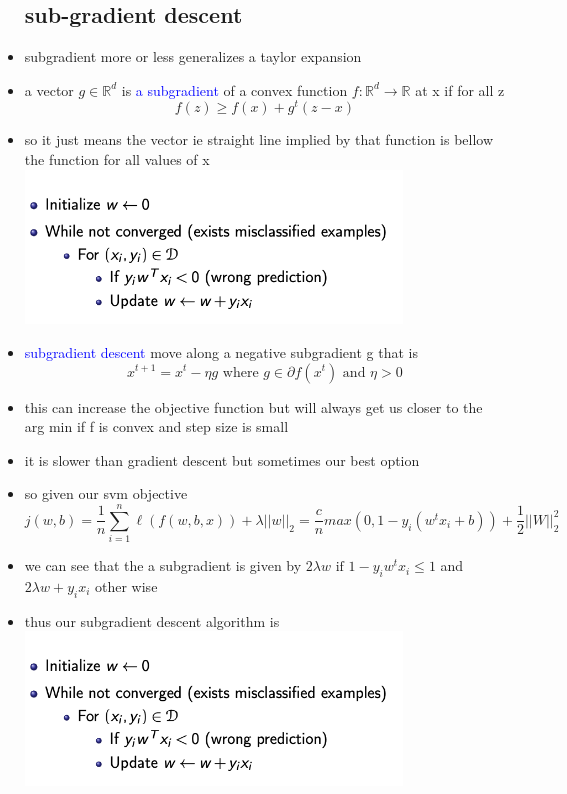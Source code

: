 \documentclass{article}
\begin{document}
\begin{itemize}
\subsection*{sub-gradient descent}
\item subgradient more or less generalizes a taylor expansion 
\item a vector $g\in \mathbb{R}^{d}$ is \textcolor{blue}{a subgradient} of a convex function $f:\mathbb{R}^{d}\rightarrow \mathbb{R}$ at x if for all z $$f(z)\geq f(x)+g^t(z-x)$$
\item so it just means the vector ie straight line implied by that function is bellow the function for all values of x\\ \includegraphics*[width=10cm]{images/Screenshot 2023-05-12 at 12.21.31 PM.png}
\item \textcolor{blue}{subgradient descent} move along a negative subgradient g that is $$x^{t+1}=x^t-\eta g \text{ where } g\in \partial f(x^t)\text{ and }\eta>0$$
\item this can increase the objective function but will always get us closer to the arg min if f is convex and step size is small 
\item it is slower than gradient descent but sometimes our best option 
\item so given our svm objective  $$j(w,b)=\frac{1}{n}\sum_{i=1}^{n}\ell(f(w,b,x))+\lambda||w||_{2}=\frac{c}{n}max(0,1-y_i(w^tx_i+b))+\frac{1}{2}||W||^2_{2} $$
\item we can see that the a subgradient is given by $2\lambda w \text{ if } 1-y_{i}w^tx_i\leq 1$ and $2\lambda w + y_ix_i $ other wise
\item thus our subgradient descent algorithm is  \\ \includegraphics*[width=10cm]{images/Screenshot 2023-05-12 at 12.21.31 PM.png}

\end{itemize}
\end{document}
